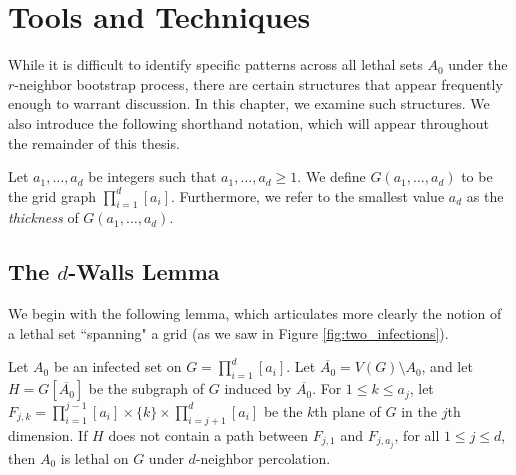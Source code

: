 \chapter{Tools and Techniques}

While it is difficult to identify specific patterns across all lethal sets $A_0$ under the $r$-neighbor bootstrap process, there are certain structures that appear frequently enough to warrant discussion. In this chapter, we examine such structures. We also introduce the following shorthand notation, which will appear throughout the remainder of this thesis. 

\begin{defn}
\label{defn:thickness}
Let $a_1, \dots, a_d$ be integers such that $a_1, \dots, a_d \geq 1$. We define $G(a_1, \dots, a_d)$ to be the grid graph $\prod_{i=1}^d [a_i]$. Furthermore, we refer to the smallest value $a_d$ as the \emph{thickness} of $G(a_1, \dots, a_d)$.
\end{defn}

\section{The $d$-Walls Lemma}

We begin with the following lemma, which articulates more clearly the notion of a lethal set ``spanning" a grid (as we saw in Figure \ref{fig:two_infections}).

\begin{lem}
\label{lem:walls}
Let $A_0$ be an infected set on $G = \prod_{i=1}^d [a_i]$. Let $\overline{A_0} = V(G) \setminus A_0$, and let $H = G[\overline{A_0}]$ be the subgraph of $G$ induced by $\overline{A_0}$. For $1 \leq k \leq a_j$, let $F_{j,k} = \prod_{i=1}^{j-1} [a_i] \times \{k\} \times \prod_{i=j+1}^{d} [a_i]$ be the $k$th plane of $G$ in the $j$th dimension. If $H$ does not contain a path between $F_{j,1}$ and $F_{j,a_j}$, for all $1 \leq j \leq d$, then $A_0$ is lethal on $G$ under $d$-neighbor percolation.
\end{lem}

